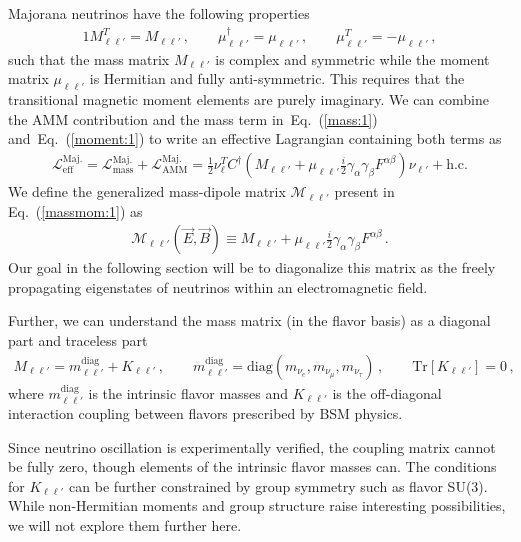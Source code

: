 \documentclass[addchapnum]{ws-rv961x669} %
\newcommand{\req}[1]{Eq.~(\ref{#1})}
\begin{document}
Majorana neutrinos have the following properties~\cite{Shrock:1982sc}
\begin{alignat}{1}
	\label{props:1}	M_{\ell\ell'}^{T}=M_{\ell\ell'}\,,\qquad
    \mu_{\ell\ell'}^{\dag}=\mu_{\ell\ell'}\,,\qquad
    \mu_{\ell\ell'}^{T}=-\mu_{\ell\ell'}\,,
\end{alignat}
such that the mass matrix $M_{\ell\ell'}$ is complex and symmetric while the moment matrix $\mu_{\ell\ell'}$ is Hermitian and fully anti-symmetric. This requires that the transitional magnetic moment elements are purely imaginary. We can combine the AMM contribution and the mass term in~\req{mass:1} and~\req{moment:1} to write an effective Lagrangian containing both terms as
\begin{align}
	\label{massmom:1}
    \mathcal{L}_\mathrm{eff}^\mathrm{Maj.} =
    \mathcal{L}_\mathrm{mass}^\mathrm{Maj.} + \mathcal{L}_\mathrm{AMM}^\mathrm{Maj.} = 
    \frac{1}{2}\nu_{\ell}^{T}C^{\dag}\left(M_{\ell\ell'}+\mu_{\ell\ell'}\frac{i}{2}\gamma_{\alpha}\gamma_{\beta}F^{\alpha\beta}\right)\nu_{\ell'}+\mathrm{h.c.}
\end{align}
We define the generalized mass-dipole matrix $\mathcal{M}_{\ell\ell'}$ present in \req{massmom:1} as
\begin{align}
	\label{massmom:2}
    \mathcal{M}_{\ell\ell'}(\vec{E},\vec{B})\equiv M_{\ell\ell'}+\mu_{\ell\ell'}\frac{i}{2}\gamma_{\alpha}\gamma_{\beta}F^{\alpha\beta}\,.
\end{align}
Our goal in the following section will be to diagonalize this matrix as the freely propagating eigenstates of neutrinos within an electromagnetic field.

Further, we can understand the mass matrix (in the flavor basis) as a diagonal part and traceless part
\begin{align}
	\label{massmom:3}
    M_{\ell\ell'}=m_{\ell\ell'}^\mathrm{diag}+K_{\ell\ell'}\,,\qquad
    m_{\ell\ell'}^\mathrm{diag}=\mathrm{diag}(m_{\nu_{e}},m_{\nu_{\mu}},m_{\nu_{\tau}})\,,\qquad
    \mathrm{Tr}\left[K_{\ell\ell'}\right] = 0 \,,
\end{align}
where $m_{\ell\ell'}^\mathrm{diag}$ is the intrinsic flavor masses and $K_{\ell\ell'}$ is the off-diagonal interaction coupling between flavors prescribed by BSM physics. 

Since neutrino oscillation is experimentally verified, the coupling matrix cannot be fully zero, though elements of the intrinsic flavor masses can. The conditions for $K_{\ell\ell'}$ can be further constrained by group symmetry such as flavor SU(3). While non-Hermitian moments and group structure raise interesting possibilities, we will not explore them further here.
\end{document}
